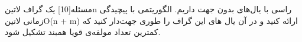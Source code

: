 
‌مسئله[10]
یک گراف ‌لاتین{n} راسی با یال‌های بدون جهت داریم. الگوریتمی با پیچیدگی زمانی ‌لاتین{O(n + m)} ارائه کنید و در آن یال های این گراف را طوری جهت‌دار کنید که کمترین تعداد مولفه‌ی قویا همبند تشکیل شود.













